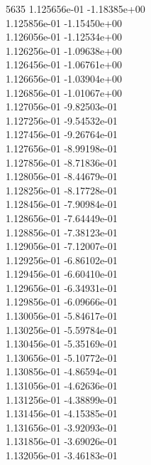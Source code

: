 5635	1.125656e-01	-1.18385e+00	\\ 	1.125856e-01	-1.15450e+00	\\ 	1.126056e-01	-1.12534e+00	\\ 	1.126256e-01	-1.09638e+00	\\ 	1.126456e-01	-1.06761e+00	\\ 	1.126656e-01	-1.03904e+00	\\ 	1.126856e-01	-1.01067e+00	\\ 	1.127056e-01	-9.82503e-01	\\ 	1.127256e-01	-9.54532e-01	\\ 	1.127456e-01	-9.26764e-01	\\ 	1.127656e-01	-8.99198e-01	\\ 	1.127856e-01	-8.71836e-01	\\ 	1.128056e-01	-8.44679e-01	\\ 	1.128256e-01	-8.17728e-01	\\ 	1.128456e-01	-7.90984e-01	\\ 	1.128656e-01	-7.64449e-01	\\ 	1.128856e-01	-7.38123e-01	\\ 	1.129056e-01	-7.12007e-01	\\ 	1.129256e-01	-6.86102e-01	\\ 	1.129456e-01	-6.60410e-01	\\ 	1.129656e-01	-6.34931e-01	\\ 	1.129856e-01	-6.09666e-01	\\ 	1.130056e-01	-5.84617e-01	\\ 	1.130256e-01	-5.59784e-01	\\ 	1.130456e-01	-5.35169e-01	\\ 	1.130656e-01	-5.10772e-01	\\ 	1.130856e-01	-4.86594e-01	\\ 	1.131056e-01	-4.62636e-01	\\ 	1.131256e-01	-4.38899e-01	\\ 	1.131456e-01	-4.15385e-01	\\ 	1.131656e-01	-3.92093e-01	\\ 	1.131856e-01	-3.69026e-01	\\ 	1.132056e-01	-3.46183e-01	\\ \hline
